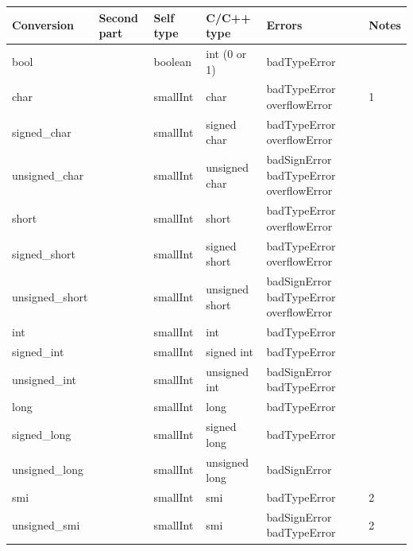 \documentclass[letterpaper,10pt,english]{sphinxmanual}
\begin{document}
\begin{tabulary}{\linewidth}{p{2cm} p{2cm} p{2cm} p{2cm} p{3cm} p{2cm}}
\hline
\textbf{
Conversion
} & \textbf{
Second part
} & \textbf{
Self type
} & \textbf{
C/C++ type
} & \textbf{
Errors
} & \textbf{
Notes
}\\\hline

bool
 &  & 
boolean
 & 
int (0 or 1)
 & 
badTypeError
 & \\\hline

char
 &  & 
smallInt
 & 
char
 & 
badTypeError overflowError
 & 
1
\\\hline

signed\_char
 &  & 
smallInt
 & 
signed char
 & 
badTypeError overflowError
 & \\\hline

unsigned\_char
 &  & 
smallInt
 & 
unsigned char
 & 
badSignError badTypeError overflowError
 & \\\hline

short
 &  & 
smallInt
 & 
short
 & 
badTypeError overflowError
 & \\\hline

signed\_short
 &  & 
smallInt
 & 
signed short
 & 
badTypeError overflowError
 & \\\hline

unsigned\_short
 &  & 
smallInt
 & 
unsigned short
 & 
badSignError badTypeError overflowError
 & \\\hline

int
 &  & 
smallInt
 & 
int
 & 
badTypeError
 & \\\hline

signed\_int
 &  & 
smallInt
 & 
signed int
 & 
badTypeError
 & \\\hline

unsigned\_int
 &  & 
smallInt
 & 
unsigned int
 & 
badSignError badTypeError
 & \\\hline

long
 &  & 
smallInt
 & 
long
 & 
badTypeError
 & \\\hline

signed\_long
 &  & 
smallInt
 & 
signed long
 & 
badTypeError
 & \\\hline

unsigned\_long
 &  & 
smallInt
 & 
unsigned long
 & 
badSignError
 & \\\hline

smi
 &  & 
smallInt
 & 
smi
 & 
badTypeError
 & 
2
\\\hline

unsigned\_smi
 &  & 
smallInt
 & 
smi
 & 
badSignError badTypeError
 & 
2
\\\hline
\end{tabulary}
\end{document}
